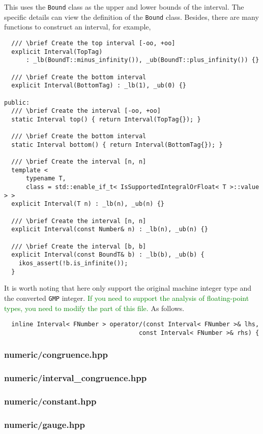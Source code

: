 \documentclass[12pt]{article}
\begin{document}
This uses the \texttt{Bound} class as the upper and lower bounds of the interval. The specific details can view the definition of the \texttt{Bound} class. Besides, there are many functions to construct an interval, for example,
\begin{lstlisting}
  /// \brief Create the top interval [-oo, +oo]
  explicit Interval(TopTag)
      : _lb(BoundT::minus_infinity()), _ub(BoundT::plus_infinity()) {}

  /// \brief Create the bottom interval
  explicit Interval(BottomTag) : _lb(1), _ub(0) {}

public:
  /// \brief Create the interval [-oo, +oo]
  static Interval top() { return Interval(TopTag{}); }

  /// \brief Create the bottom interval
  static Interval bottom() { return Interval(BottomTag{}); }

  /// \brief Create the interval [n, n]
  template <
      typename T,
      class = std::enable_if_t< IsSupportedIntegralOrFloat< T >::value > >
  explicit Interval(T n) : _lb(n), _ub(n) {}

  /// \brief Create the interval [n, n]
  explicit Interval(const Number& n) : _lb(n), _ub(n) {}

  /// \brief Create the interval [b, b]
  explicit Interval(const BoundT& b) : _lb(b), _ub(b) {
    ikos_assert(!b.is_infinite());
  }
\end{lstlisting}

It is worth noting that here only support the original machine integer type and the converted \texttt{GMP} integer. \textcolor{green}{If you need to support the analysis of floating-point types, you need to modify the part of this file.} As follows.
\begin{lstlisting}
  inline Interval< FNumber > operator/(const Interval< FNumber >& lhs,
                                     const Interval< FNumber >& rhs) {
\end{lstlisting}

\subsubsection{numeric/congruence.hpp}

\subsubsection{numeric/interval\_congruence.hpp}

\subsubsection{numeric/constant.hpp}

\subsubsection{numeric/gauge.hpp}
\end{document}
